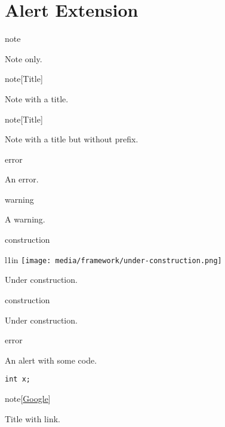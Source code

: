 
\chapter{\label{alert-extension}Alert Extension}
\begin{alert}[note]{note}

\par Note only.
\end{alert}

\begin{alert}[note]{note}[Title]

\par Note with a title.
\end{alert}

\begin{alert}[]{note}[Title]

\par Note with a title but without prefix.
\end{alert}

\begin{alert}[error]{error}

\par An error.
\end{alert}

\begin{alert}[warning]{warning}

\par A warning.
\end{alert}
\begin{alert}[construction]{construction}

\begin{wrapfigure}{l}{1in}
\texttt{[image: media/framework/under-construction.png]}
\end{wrapfigure}

\par Under construction.
\end{alert}
\begin{alert}[construction]{construction}

\par Under construction.
\end{alert}

\begin{alert}[error]{error}

\par An alert with some code.
\begin{verbatim}
int x;
\end{verbatim}

\end{alert}

\begin{alert}[note]{note}[\href{https://google.com}{Google}]

\par Title with link.
\end{alert}
